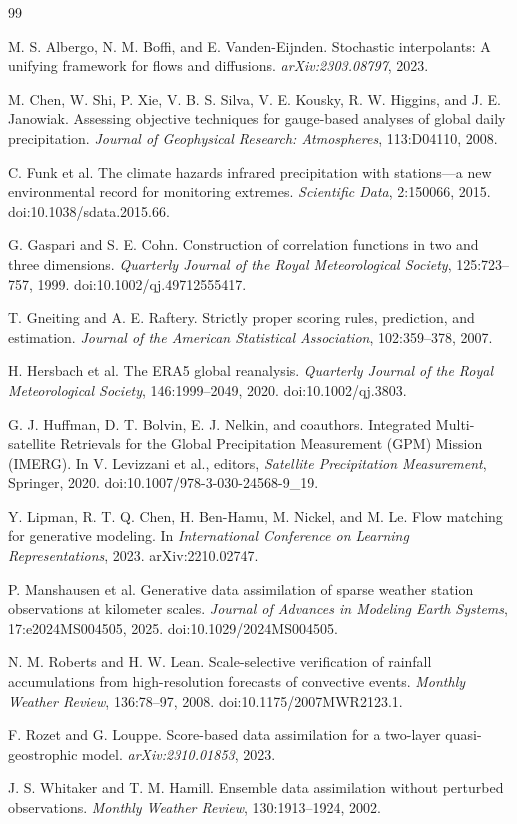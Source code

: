 \documentclass[10pt,twocolumn]{article}
\begin{document}
\clearpage
\twocolumn

\begin{thebibliography}{99}

M. S. Albergo, N. M. Boffi, and E. Vanden-Eijnden.
Stochastic interpolants: A unifying framework for flows and diffusions.
\emph{arXiv:2303.08797}, 2023.

M. Chen, W. Shi, P. Xie, V. B. S. Silva, V. E. Kousky, R. W. Higgins, and J. E. Janowiak.
Assessing objective techniques for gauge-based analyses of global daily precipitation.
\emph{Journal of Geophysical Research: Atmospheres}, 113:D04110, 2008.

C. Funk et al.
The climate hazards infrared precipitation with stations---a new environmental record for monitoring extremes.
\emph{Scientific Data}, 2:150066, 2015.
doi:10.1038/sdata.2015.66.

G. Gaspari and S. E. Cohn.
Construction of correlation functions in two and three dimensions.
\emph{Quarterly Journal of the Royal Meteorological Society}, 125:723--757, 1999.
doi:10.1002/qj.49712555417.

T. Gneiting and A. E. Raftery.
Strictly proper scoring rules, prediction, and estimation.
\emph{Journal of the American Statistical Association}, 102:359--378, 2007.

H. Hersbach et al.
The ERA5 global reanalysis.
\emph{Quarterly Journal of the Royal Meteorological Society}, 146:1999--2049, 2020.
doi:10.1002/qj.3803.

G. J. Huffman, D. T. Bolvin, E. J. Nelkin, and coauthors.
Integrated Multi-satellite Retrievals for the Global Precipitation Measurement (GPM) Mission (IMERG).
In V. Levizzani et al., editors, \emph{Satellite Precipitation Measurement}, Springer, 2020.
doi:10.1007/978-3-030-24568-9\_19.

Y. Lipman, R. T. Q. Chen, H. Ben-Hamu, M. Nickel, and M. Le.
Flow matching for generative modeling.
In \emph{International Conference on Learning Representations}, 2023.
arXiv:2210.02747.

P. Manshausen et al.
Generative data assimilation of sparse weather station observations at kilometer scales.
\emph{Journal of Advances in Modeling Earth Systems}, 17:e2024MS004505, 2025.
doi:10.1029/2024MS004505.

N. M. Roberts and H. W. Lean.
Scale-selective verification of rainfall accumulations from high-resolution forecasts of convective events.
\emph{Monthly Weather Review}, 136:78--97, 2008.
doi:10.1175/2007MWR2123.1.

F. Rozet and G. Louppe.
Score-based data assimilation for a two-layer quasi-geostrophic model.
\emph{arXiv:2310.01853}, 2023.

J. S. Whitaker and T. M. Hamill.
Ensemble data assimilation without perturbed observations.
\emph{Monthly Weather Review}, 130:1913--1924, 2002.

\end{thebibliography}
\end{document}
